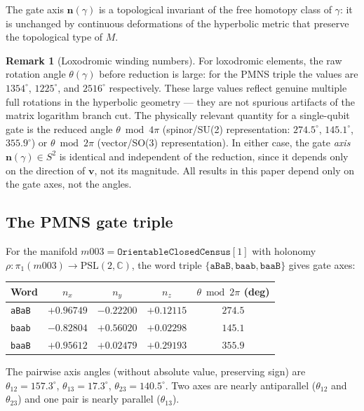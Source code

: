 \documentclass[12pt]{article}
\theoremstyle{definition}
\newtheorem{remark}[theorem]{Remark}
\begin{document}
The gate axis $\mathbf{n}(\gamma)$ is a topological invariant of
the free homotopy class of $\gamma$: it is unchanged by continuous
deformations of the hyperbolic metric that preserve the topological
type of $M$.

\begin{remark}[Loxodromic winding numbers]
For loxodromic elements, the raw rotation angle $\theta(\gamma)$
before reduction is large: for the PMNS triple the values are
$1354^\circ$, $1225^\circ$, and $2516^\circ$ respectively.
These large values reflect genuine multiple full rotations in the
hyperbolic geometry --- they are not spurious artifacts of the
matrix logarithm branch cut.
The physically relevant quantity for a single-qubit gate is
the reduced angle $\theta \bmod 4\pi$ (spinor/SU(2) representation:
$274.5^\circ$, $145.1^\circ$, $355.9^\circ$) or $\theta \bmod 2\pi$
(vector/SO(3) representation). In either case, the gate
\emph{axis} $\mathbf{n}(\gamma) \in S^2$ is identical and
independent of the reduction, since it depends only on the
direction of $\mathbf{v}$, not its magnitude. All results
in this paper depend only on the gate axes, not the angles.
\end{remark}

\subsection{The PMNS gate triple}

For the manifold $m003 = \texttt{OrientableClosedCensus}[1]$
with holonomy $\rho: \pi_1(m003) \to \mathrm{PSL}(2,\mathbb{C})$,
the word triple $\{\texttt{aBaB}, \texttt{baab}, \texttt{baaB}\}$
gives gate axes:

\begin{center}
\begin{tabular}{lcccc}
\toprule
Word & $n_x$ & $n_y$ & $n_z$ &
  $\theta \bmod 2\pi$ (deg) \\
\midrule
\texttt{aBaB} & $+0.96749$ & $-0.22200$ & $+0.12115$ & $274.5$ \\
\texttt{baab} & $-0.82804$ & $+0.56020$ & $+0.02298$ & $145.1$ \\
\texttt{baaB} & $+0.95612$ & $+0.02479$ & $+0.29193$ & $355.9$ \\
\bottomrule
\end{tabular}
\end{center}

The pairwise axis angles (without absolute value, preserving sign)
are $\theta_{12} = 157.3^\circ$, $\theta_{13} = 17.3^\circ$,
$\theta_{23} = 140.5^\circ$. Two axes are nearly antiparallel
($\theta_{12}$ and $\theta_{23}$) and one pair is nearly parallel
($\theta_{13}$).
\end{document}
